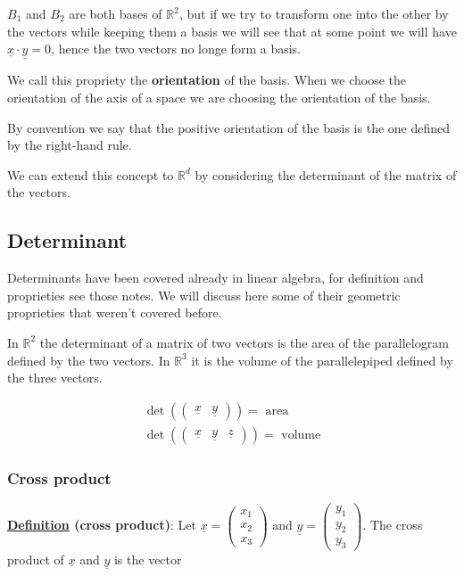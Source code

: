 \documentclass[10pt]{extarticle}
\newcommand{\R}{\mathbb{R}}
\begin{document}
$B_1$ and $B_2$ are both bases of $\R^2$, but if we try to  transform one into the other by  the vectors
while keeping them a basis we will see that at some point we will have $\underline{x} \cdot \underline{y} = 0$,
hence the two vectors no longe form a basis.

We call this propriety the \textbf{orientation} of the basis.
When we choose the orientation of the axis of a space we are choosing the orientation of the basis.

By convention we say that the positive orientation of the basis is the one defined by the right-hand rule.

We can extend this concept to $\R^d$ by considering the determinant of the matrix of the vectors.

\subsection{Determinant}

Determinants have been covered already in linear algebra, for definition and proprieties see those notes.
We will discuss here some of their geometric proprieties that weren't covered before.

In $\R^2$ the determinant of a matrix of two vectors is the area of the parallelogram defined by the two vectors.
In $\R^3$ it is the volume of the parallelepiped defined by the three vectors.

\begin{gather*}
    \det \left( \begin{pmatrix}
            \underline{x} & \underline{y}
        \end{pmatrix} \right) = \text{ area} \\
    \det \left( \begin{pmatrix}
            \underline{x} & \underline{y} & \underline{z}
        \end{pmatrix} \right) = \text{ volume}
\end{gather*}

\subsubsection{Cross product}

\textbf{\underline{Definition} (cross product)}: Let $\underline{x} = \begin{pmatrix}
        x_1 \\ x_2 \\ x_3
    \end{pmatrix}$ and $\underline{y} = \begin{pmatrix}
        y_1 \\ y_2 \\ y_3
    \end{pmatrix}$.
The cross product of $\underline{x}$ and $\underline{y}$ is the vector
\end{document}
